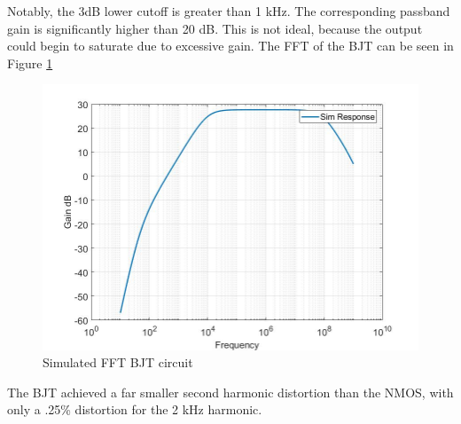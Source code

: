 Notably, the 3dB lower cutoff is greater than 1 kHz. The corresponding passband gain is significantly higher than 20 dB. This is not ideal, because the output could begin to saturate due to excessive gain. The FFT of the BJT can be seen in Figure \ref{fig:bjtFFT}

\begin{figure}[H]
	\centering
	\includegraphics[width=.55\textwidth]{CircuitDevelopment/BJT_bandwidth.jpg}
	\caption{Simulated FFT BJT circuit}
	\label{fig:bjtFFT}
\end{figure}

The BJT achieved a far smaller second harmonic distortion than the NMOS, with only a .25\% distortion for the 2 kHz harmonic.



 



